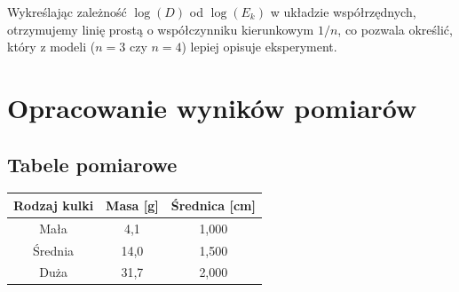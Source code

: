 \documentclass[a4paper,12pt]{article}
\begin{document}
Wykreślając zależność $\log(D)$ od $\log(E_k)$ w układzie współrzędnych, otrzymujemy linię prostą o współczynniku kierunkowym $1/n$, co pozwala określić, który z modeli ($n=3$ czy $n=4$) lepiej opisuje eksperyment.






\section{Opracowanie wyników pomiarów}

\subsection{Tabele pomiarowe}

\begin{center}
    \begin{tabular}{|c|c|c|}
        \hline
        Rodzaj kulki & Masa [g] & Średnica [cm] \\
        \hline
        Mała & 4,1 & 1,000 \\
        Średnia & 14,0 & 1,500 \\
        Duża & 31,7 & 2,000 \\
        \hline
    \end{tabular}
    \label{tab:kulki}
\end{center}
\end{document}
